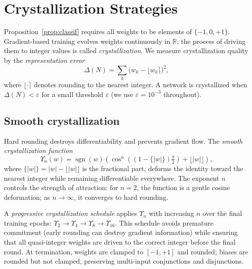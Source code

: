 \documentclass[12pt,a4paper]{article}
\begin{document}
\section{Crystallization Strategies}
\label{sec:crystal}

Proposition~\ref{prop:classif} requires all weights to be elements of
$\{-1, 0, +1\}$.
Gradient-based training evolves weights continuously in $\mathbb{R}$; the
process of driving them to integer values is called \emph{crystallization}.
We measure crystallization quality by the \emph{representation error}
\begin{equation}
  \Delta(N) = \sum_{k} \bigl(w_k - \lfloor w_k \rceil\bigr)^2,
  \label{eq:delta}
\end{equation}
where $\lfloor \cdot \rceil$ denotes rounding to the nearest integer.
A network is crystallized when $\Delta(N) < \varepsilon$ for a small
threshold $\varepsilon$ (we use $\varepsilon = 10^{-3}$ throughout).

\subsection{Smooth crystallization}
\label{ssec:smooth}

Hard rounding destroys differentiability and prevents gradient flow.
The \emph{smooth crystallization function}
\begin{equation}
  \Upsilon_n(w) = \operatorname{sgn}(w)\!\left(
    \cos^n\!\!\left((1 - \{|w|\})\tfrac{\pi}{2}\right) + \lfloor|w|\rfloor
  \right),
  \label{eq:upsilon}
\end{equation}
where $\{|w|\} = |w| - \lfloor|w|\rfloor$ is the fractional part,
deforms the identity toward the nearest integer while remaining
differentiable everywhere.
The exponent $n$ controls the strength of attraction: for $n = 2$, the
function is a gentle cosine deformation; as $n \to \infty$, it converges
to hard rounding.

A \emph{progressive crystallization schedule} applies $\Upsilon_n$ with
increasing $n$ over the final training epochs:
$\Upsilon_2 \to \Upsilon_4 \to \Upsilon_8 \to \Upsilon_{16}$.
This schedule avoids premature commitment (early rounding can destroy
gradient information) while ensuring that all quasi-integer weights are
driven to the correct integer before the final round.
At termination, weights are clamped to $[-1, +1]$ and rounded; biases
are rounded but not clamped, preserving multi-input conjunctions and
disjunctions.
\end{document}

